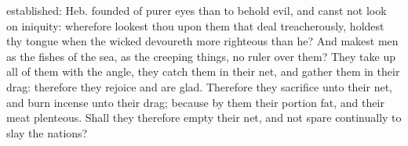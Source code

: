 {{established: Heb. founded}
 of
purer
eyes than to
behold
evil, and
canst not
look on
iniquity: wherefore
lookest thou upon them that deal
treacherously,
{} holdest thy
tongue when the
wicked
devoureth
{} more
righteous than he?
And
makest
men as the
fishes of the
sea, as the creeping
things,
{} no
ruler over them?
They take
up all of them with the
angle, they
catch them in their
net, and
gather them in their
drag: therefore they
rejoice and are
glad.
Therefore they
sacrifice unto their
net, and burn
incense unto their
drag; because by
them their
portion
{}
fat, and their
meat
plenteous.
Shall they therefore
empty their
net, and not
spare
continually to
slay the
nations?

}
